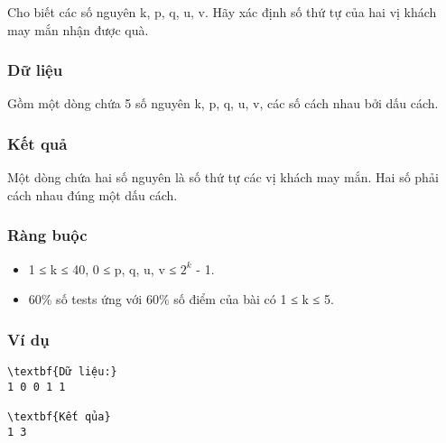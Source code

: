 Cho biết các số nguyên k, p, q, u, v. Hãy xác định số thứ tự của hai vị khách may mắn nhận được quà.

\subsubsection{Dữ liệu}

Gồm một dòng chứa 5 số nguyên k, p, q, u, v, các số cách nhau bởi dấu cách.

\subsubsection{Kết quả}

Một dòng chứa hai số nguyên là số thứ tự các vị khách may mắn. Hai số phải cách nhau đúng một dấu cách.

\subsubsection{Ràng buộc}
\begin{itemize}
	\item 1 ≤ k ≤ 40, 0 ≤ p, q, u, v ≤ $2^{k}$ - 1.
	\item 60\% số tests ứng với 60\% số điểm của bài có 1 ≤ k ≤ 5.
\end{itemize}

\subsubsection{Ví dụ}
\begin{verbatim}
\textbf{Dữ liệu:}
1 0 0 1 1

\textbf{Kết qủa}
1 3
\end{verbatim}
